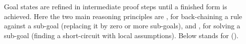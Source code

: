 \begin{isabellebody}
\begin{isamarkuptext}
  \noindent Goal states are refined in intermediate proof steps until
  a finished form is achieved.  Here the two main reasoning principles
  are \hyperlink{inference.resolution}{\mbox{}}, for back-chaining a rule against a
  sub-goal (replacing it by zero or more sub-goals), and \hyperlink{inference.assumption}{\mbox{}}, for solving a sub-goal (finding a short-circuit with
  local assumptions).  Below  stands for  ().


\end{isamarkuptext}
\end{isabellebody}
